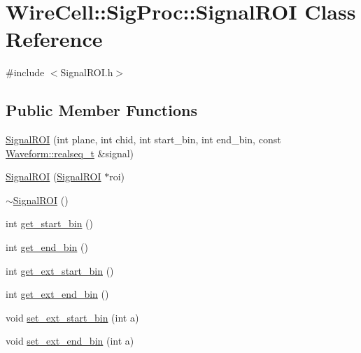 \hypertarget{class_wire_cell_1_1_sig_proc_1_1_signal_r_o_i}{}\section{Wire\+Cell\+:\+:Sig\+Proc\+:\+:Signal\+R\+OI Class Reference}
\label{class_wire_cell_1_1_sig_proc_1_1_signal_r_o_i}


{\ttfamily \#include $<$Signal\+R\+O\+I.\+h$>$}

\subsection*{Public Member Functions}
\begin{DoxyCompactItemize}
\item 
\hyperlink{class_wire_cell_1_1_sig_proc_1_1_signal_r_o_i_ab8d07b50d3925529673ce79238ab0480}{Signal\+R\+OI} (int plane, int chid, int start\+\_\+bin, int end\+\_\+bin, const \hyperlink{namespace_wire_cell_1_1_waveform_a479175e541c8545e87cd8063b74b6956}{Waveform\+::realseq\+\_\+t} \&signal)
\item 
\hyperlink{class_wire_cell_1_1_sig_proc_1_1_signal_r_o_i_a19b3f1c69aa59c14e928af82302de058}{Signal\+R\+OI} (\hyperlink{class_wire_cell_1_1_sig_proc_1_1_signal_r_o_i}{Signal\+R\+OI} $\ast$roi)
\item 
\hyperlink{class_wire_cell_1_1_sig_proc_1_1_signal_r_o_i_a1d77c82a9e71b8700acc7df8b0eb5c08}{$\sim$\+Signal\+R\+OI} ()
\item 
int \hyperlink{class_wire_cell_1_1_sig_proc_1_1_signal_r_o_i_acfe33b6d693694e95f905a34a2940c32}{get\+\_\+start\+\_\+bin} ()
\item 
int \hyperlink{class_wire_cell_1_1_sig_proc_1_1_signal_r_o_i_a826112ffb7fed5ffeff403e4a34c036c}{get\+\_\+end\+\_\+bin} ()
\item 
int \hyperlink{class_wire_cell_1_1_sig_proc_1_1_signal_r_o_i_ab7e97b198f41b189dc24556c6c0ccd52}{get\+\_\+ext\+\_\+start\+\_\+bin} ()
\item 
int \hyperlink{class_wire_cell_1_1_sig_proc_1_1_signal_r_o_i_a5d660871a8da8908e8ee1e1ed99a7ce7}{get\+\_\+ext\+\_\+end\+\_\+bin} ()
\item 
void \hyperlink{class_wire_cell_1_1_sig_proc_1_1_signal_r_o_i_ae20c381a6855844b0177f2ab96ac50a6}{set\+\_\+ext\+\_\+start\+\_\+bin} (int a)
\item 
void \hyperlink{class_wire_cell_1_1_sig_proc_1_1_signal_r_o_i_a1057a64f15a6093ab46679c4d54524ba}{set\+\_\+ext\+\_\+end\+\_\+bin} (int a)

\end{DoxyCompactItemize}
